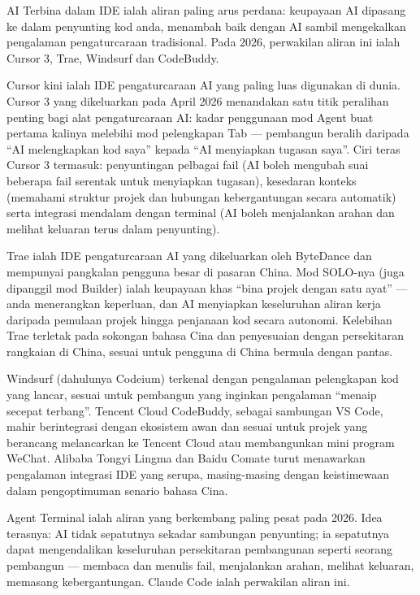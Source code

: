 
AI Terbina dalam IDE ialah aliran paling arus perdana: keupayaan AI dipasang ke dalam penyunting kod anda, menambah baik dengan AI sambil mengekalkan pengalaman pengaturcaraan tradisional. Pada 2026, perwakilan aliran ini ialah Cursor 3, Trae, Windsurf dan CodeBuddy.


Cursor kini ialah IDE pengaturcaraan AI yang paling luas digunakan di dunia. Cursor 3 yang dikeluarkan pada April 2026 menandakan satu titik peralihan penting bagi alat pengaturcaraan AI: kadar penggunaan mod Agent buat pertama kalinya melebihi mod pelengkapan Tab — pembangun beralih daripada “AI melengkapkan kod saya” kepada “AI menyiapkan tugasan saya”. Ciri teras Cursor 3 termasuk: penyuntingan pelbagai fail (AI boleh mengubah suai beberapa fail serentak untuk menyiapkan tugasan), kesedaran konteks (memahami struktur projek dan hubungan kebergantungan secara automatik) serta integrasi mendalam dengan terminal (AI boleh menjalankan arahan dan melihat keluaran terus dalam penyunting).


Trae ialah IDE pengaturcaraan AI yang dikeluarkan oleh ByteDance dan mempunyai pangkalan pengguna besar di pasaran China. Mod SOLO-nya (juga dipanggil mod Builder) ialah keupayaan khas “bina projek dengan satu ayat” — anda menerangkan keperluan, dan AI menyiapkan keseluruhan aliran kerja daripada pemulaan projek hingga penjanaan kod secara autonomi. Kelebihan Trae terletak pada sokongan bahasa Cina dan penyesuaian dengan persekitaran rangkaian di China, sesuai untuk pengguna di China bermula dengan pantas.


Windsurf (dahulunya Codeium) terkenal dengan pengalaman pelengkapan kod yang lancar, sesuai untuk pembangun yang inginkan pengalaman “menaip secepat terbang”. Tencent Cloud CodeBuddy, sebagai sambungan VS Code, mahir berintegrasi dengan ekosistem awan dan sesuai untuk projek yang berancang melancarkan ke Tencent Cloud atau membangunkan mini program WeChat. Alibaba Tongyi Lingma dan Baidu Comate turut menawarkan pengalaman integrasi IDE yang serupa, masing-masing dengan keistimewaan dalam pengoptimuman senario bahasa Cina.


Agent Terminal ialah aliran yang berkembang paling pesat pada 2026. Idea terasnya: AI tidak sepatutnya sekadar sambungan penyunting; ia sepatutnya dapat mengendalikan keseluruhan persekitaran pembangunan seperti seorang pembangun — membaca dan menulis fail, menjalankan arahan, melihat keluaran, memasang kebergantungan. Claude Code ialah perwakilan aliran ini.

